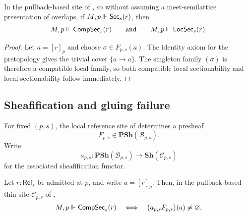 \begin{proposition}\label{prop:global-implies-compatible-local}
In the pullback-based site of , so without assuming a meet-semilattice presentation of overlaps, if $M,p\Vdash \mathsf{Sec}_s(r)$, then
\[
M,p\Vdash \mathsf{CompSec}_s(r)
\qquad\text{and}\qquad
M,p\Vdash \mathsf{LocSec}_s(r).
\]
\end{proposition}

\begin{proof}
Let $a=[r]_p$ and choose $\sigma\in F_{p,s}(a)$. The identity axiom for the pretopology gives the trivial cover $\{a\to a\}$. The singleton family $(\sigma)$ is therefore a compatible local family, so both compatible local sectionability and local sectionability follow immediately.
\end{proof}

\subsection{Sheafification and gluing failure}

For fixed $(p,s)$, the local reference site of  determines a presheaf
\[
F_{p,s}\in\mathbf{PSh}(\mathcal{B}_{p,s}).
\]
Write
\[
a_{p,s}:\mathbf{PSh}(\mathcal{B}_{p,s})\to\mathbf{Sh}(\mathcal{C}_{p,s})
\]
for the associated sheafification functor.

\begin{proposition}\label{thm:sheafification-characterization}
Let $r:\mathsf{Ref}_s$ be admitted at $p$, and write $a=[r]_p$. Then, in the pullback-based thin site $\mathcal C_{p,s}$ of ,
\[
M,p\Vdash \mathsf{CompSec}_s(r)
\quad\Longleftrightarrow\quad
\bigl(a_{p,s}F_{p,s}\bigr)(a)\neq\varnothing.
\]
\end{proposition}

